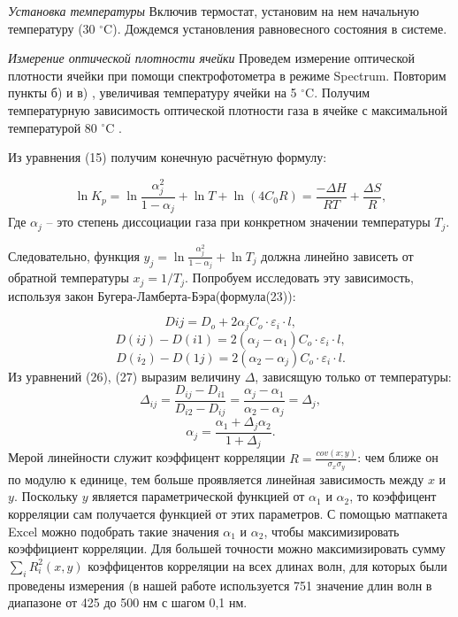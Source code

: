 \documentclass[a4paper,12pt]{article} %
\begin{document}
\emph{Установка температуры}
Включив термостат, установим на нем начальную температуру (30 $^\circ$C). Дождемся установления равновесного состояния в системе.

\emph{Измерение оптической плотности ячейки}
Проведем измерение оптической плотности ячейки при помощи спектрофотометра в режиме Spectrum. Повторим пункты б) и в) , увеличивая температуру ячейки на 5 $^\circ$C. Получим температурную зависимость оптической плотности газа в ячейке с максимальной температурой 80 $^\circ $C .

Из уравнения (15) получим конечную расчётную формулу:

\begin{equation}
\ln K_p = \ln \frac{ \alpha_j^2}{1 - \alpha_j} + \ln T + \ln (4C_0 R) = \frac{-\Delta H}{RT} + \frac{\Delta S}{R},
\end{equation}
Где $\alpha_j$ -- это степень диссоциации газа при конкретном значении температуры $T_j$. 

Следовательно, функция $y_j =  \ln \frac{ \alpha_j^2}{1 - \alpha_j} + \ln T_j $ должна линейно зависеть от обратной температуры $x_j = 1/T_j$. 
Попробуем исследовать эту зависимость, используя закон Бугера-Ламберта-Бэра(формула(23)): 


\begin{equation}
D{ij} =D_o + 2\alpha_jC_o \cdot \varepsilon_i \cdot l,
\end{equation}
\begin{equation}
D(ij) - D(i1) =2(\alpha_j - \alpha_1)C_o \cdot \varepsilon_i\cdot l,
\end{equation}
\begin{equation}
D(i_2) - D(1j) =2( \alpha_2 - \alpha_j)C_o \cdot \varepsilon_i \cdot l.
\end{equation}
Из уравнений (26), (27) выразим величину $\Delta$, зависящую только от температуры:
\begin{equation}
\Delta_{ij} = \frac{D_{ij} - D_{i1}}{D_{i2} - D_{ij}} = \frac{\alpha_{j} - \alpha_{1}}{\alpha_{2} - \alpha_{j}} = \Delta_{j},
\end{equation}
\begin{equation}
\alpha_j = \frac{\alpha_1 + \Delta_{j}\alpha_2}{1 + \Delta_{j}}.
\end{equation}
Мерой линейности служит коэффицент корреляции $R = \frac{cov(x;y)}{\sigma_x\sigma_y}$: чем ближе он по модулю к единице, тем больше проявляется линейная зависимость между  $x$ и $y$. Поскольку $y$ является параметрической функцией от $\alpha_1$ и $\alpha_2$, то коэффицент корреляции сам получается функцией от этих параметров. С помощью матпакета Excel можно подобрать такие значения $\alpha_1$ и $\alpha_2$, чтобы максимизировать коэффициент корреляции. Для большей точности можно максимизировать сумму $\sum_{i}R_i^2(x, y)$ коэффицентов корреляции на всех длинах волн, для которых были проведены измерения (в нашей работе используется 751 значение длин волн в диапазоне от 425 до 500 нм с шагом 0,1 нм.
\end{document}
